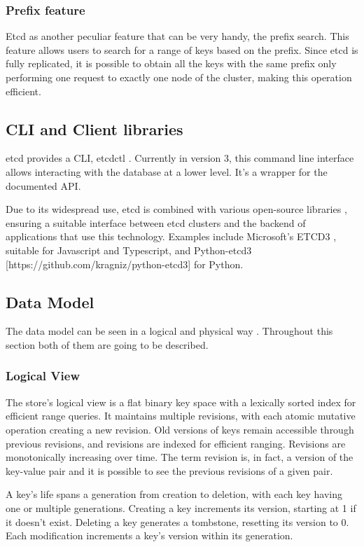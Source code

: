 \documentclass[screen,review]{acmart}
\begin{document}
\subsubsection{Prefix feature}
Etcd as another peculiar feature that can be very handy, the prefix search. This feature allows users to search for a range of keys based on the prefix. Since etcd is fully replicated, it is possible to obtain all the keys with the same prefix only performing one request to exactly one node of the cluster, making this operation efficient.

\subsection{CLI and Client libraries}

etcd provides a CLI, etcdctl \cite{etcd_clt}. Currently in version 3, this command line interface allows interacting with the database at a lower level. It's a wrapper for the documented API.

Due to its widespread use, etcd is combined with various open-source libraries \cite{etcd_library}, ensuring a suitable interface between etcd clusters and the backend of applications that use this technology. Examples include Microsoft's ETCD3 \cite{etcd}, suitable for Javascript and Typescript, and Python-etcd3 [https://github.com/kragniz/python-etcd3] for Python.

\subsection{Data Model}
The data model can be seen in a logical and physical way \cite{etcd_data_model}. Throughout this section both of them are going to be described.

\subsubsection{Logical View}
The store's logical view is a flat binary key space with a lexically sorted index for efficient range queries. It maintains multiple revisions, with each atomic mutative operation creating a new revision. Old versions of keys remain accessible through previous revisions, and revisions are indexed for efficient ranging. Revisions are monotonically increasing over time. The term revision is, in fact, a version of the key-value pair and it is possible to see the previous revisions of a given pair.

A key's life spans a generation from creation to deletion, with each key having one or multiple generations. Creating a key increments its version, starting at 1 if it doesn't exist. Deleting a key generates a tombstone, resetting its version to 0. Each modification increments a key's version within its generation.
\end{document}
